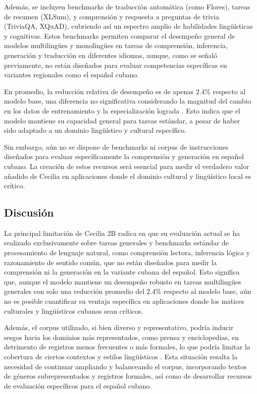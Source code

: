 \documentclass[10pt,twoside]{rcmart} %
\begin{document}
Además, se incluyen benchmarks de traducción automática (como Flores), tareas de resumen (XLSum), y comprensión y respuesta a preguntas de trivia (TriviaQA, XQuAD), cubriendo así un espectro amplio de habilidades lingüísticas y cognitivas. Estos benchmarks permiten comparar el desempeño general de modelos multilingües y monolingües en tareas de comprensión, inferencia, generación y traducción en diferentes idiomas, aunque, como se señaló previamente, no están diseñados para evaluar competencias específicas en variantes regionales como el español cubano.

En promedio, la reducción relativa de desempeño es de apenas $2.4\%$ respecto al modelo base, una diferencia no significativa considerando la magnitud del cambio en los datos de entrenamiento y la especialización lograda \cite{@guo2023continuous}. Esto indica que el modelo mantiene su capacidad general para tareas estándar, a pesar de haber sido adaptado a un dominio lingüístico y cultural específico.

Sin embargo, aún no se dispone de benchmarks ni corpus de instrucciones diseñados para evaluar específicamente la comprensión y generación en español cubano. La creación de estos recursos será esencial para medir el verdadero valor añadido de Cecilia en aplicaciones donde el dominio cultural y lingüístico local es crítico.

\subsection{Discusión}

La principal limitación de Cecilia 2B radica en que su evaluación actual se ha realizado exclusivamente sobre tareas generales y benchmarks estándar de procesamiento de lenguaje natural, como comprensión lectora, inferencia lógica y razonamiento de sentido común, que no están diseñados para medir la comprensión ni la generación en la variante cubana del español. Esto significa que, aunque el modelo mantiene un desempeño robusto en tareas multilingües generales con solo una reducción promedio del $2.4\%$ respecto al modelo base, aún no es posible cuantificar su ventaja específica en aplicaciones donde los matices culturales y lingüísticos cubanos sean críticos.

Además, el corpus utilizado, si bien diverso y representativo, podría inducir sesgos hacia los dominios más representados, como prensa y enciclopedias, en detrimento de registros menos frecuentes o más formales, lo que podría limitar la cobertura de ciertos contextos y estilos lingüísticos \cite{@cahyawijaya2025crowdsource}. Esta situación resalta la necesidad de continuar ampliando y balanceando el corpus, incorporando textos de géneros subrepresentados y registros formales, así como de desarrollar recursos de evaluación específicos para el español cubano.
\end{document}
